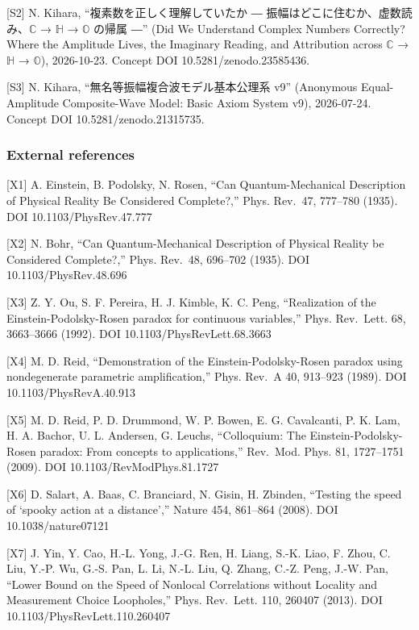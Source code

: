 \documentclass[
  a4paper,
]{article}
\begin{document}
{[}S2{]} N. Kihara, ``複素数を正しく理解していたか ―
振幅はどこに住むか、虚数読み、\(\mathbb{C}\) → \(\mathbb{H}\) →
\(\mathbb{O}\) の帰属 ―'' (Did We Understand Complex Numbers Correctly?
Where the Amplitude Lives, the Imaginary Reading, and Attribution across
\(\mathbb{C}\) → \(\mathbb{H}\) → \(\mathbb{O}\)), 2026-10-23. Concept
DOI 10.5281/zenodo.23585436.

{[}S3{]} N. Kihara, ``無名等振幅複合波モデル基本公理系 v9'' (Anonymous
Equal-Amplitude Composite-Wave Model: Basic Axiom System v9),
2026-07-24. Concept DOI 10.5281/zenodo.21315735.

\subsubsection{External references}\label{external-references}

{[}X1{]} A. Einstein, B. Podolsky, N. Rosen, ``Can Quantum-Mechanical
Description of Physical Reality Be Considered Complete?,'' Phys.
Rev.~47, 777--780 (1935). DOI 10.1103/PhysRev.47.777

{[}X2{]} N. Bohr, ``Can Quantum-Mechanical Description of Physical
Reality be Considered Complete?,'' Phys. Rev.~48, 696--702 (1935). DOI
10.1103/PhysRev.48.696

{[}X3{]} Z. Y. Ou, S. F. Pereira, H. J. Kimble, K. C. Peng,
``Realization of the Einstein-Podolsky-Rosen paradox for continuous
variables,'' Phys. Rev.~Lett. 68, 3663--3666 (1992). DOI
10.1103/PhysRevLett.68.3663

{[}X4{]} M. D. Reid, ``Demonstration of the Einstein-Podolsky-Rosen
paradox using nondegenerate parametric amplification,'' Phys. Rev.~A 40,
913--923 (1989). DOI 10.1103/PhysRevA.40.913

{[}X5{]} M. D. Reid, P. D. Drummond, W. P. Bowen, E. G. Cavalcanti, P.
K. Lam, H. A. Bachor, U. L. Andersen, G. Leuchs, ``Colloquium: The
Einstein-Podolsky-Rosen paradox: From concepts to applications,''
Rev.~Mod. Phys. 81, 1727--1751 (2009). DOI 10.1103/RevModPhys.81.1727

{[}X6{]} D. Salart, A. Baas, C. Branciard, N. Gisin, H. Zbinden,
``Testing the speed of `spooky action at a distance','' Nature 454,
861--864 (2008). DOI 10.1038/nature07121

{[}X7{]} J. Yin, Y. Cao, H.-L. Yong, J.-G. Ren, H. Liang, S.-K. Liao, F.
Zhou, C. Liu, Y.-P. Wu, G.-S. Pan, L. Li, N.-L. Liu, Q. Zhang, C.-Z.
Peng, J.-W. Pan, ``Lower Bound on the Speed of Nonlocal Correlations
without Locality and Measurement Choice Loopholes,'' Phys. Rev.~Lett.
110, 260407 (2013). DOI 10.1103/PhysRevLett.110.260407
\end{document}
